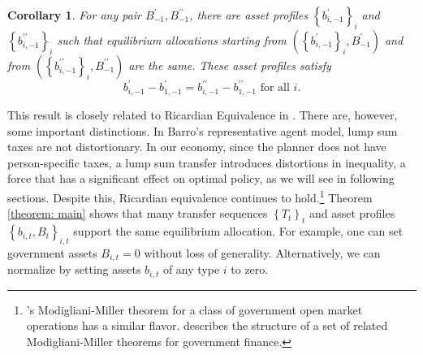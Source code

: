\documentclass[thmsb,11pt]{article}
\newtheorem{corollary}{Corollary}
\begin{document}
\begin{corollary}
\label{corr: B does not matter} For any pair $B_{-1}^{\prime },B_{-1}^{\prime
\prime }$, there are asset profiles $\left\{ b_{i,-1}^{\prime }\right\} _{i}$ and $%
\left\{ b_{i,-1}^{\prime \prime }\right\} _{i}$ such that
equilibrium allocations starting from  $\left( \left\{ b_{i,-1}^{\prime }\right\}
_{i},B_{-1}^{\prime }\right) $ and  from  $\left( \left\{ b_{i,-1}^{\prime
\prime }\right\} _{i},B_{-1}^{\prime \prime }\right) $ are the same.
These asset profiles satisfy%
\begin{equation*}
b_{i,-1}^{\prime }-b_{1,-1}^{\prime }=b_{i,-1}^{\prime \prime
}-b_{1,-1}^{\prime \prime }\text{ for all }i.
\end{equation*}
\end{corollary}
%


%

\smallskip
This result is closely related to Ricardian Equivalence in \citet{Barro1974}. There are, however, some important distinctions. In Barro's representative agent model, lump sum taxes are not distortionary. In our economy, since the planner does not have person-specific taxes, a lump sum transfer introduces distortions in inequality, a  force that has a significant effect on optimal policy,  as we will see in following sections.   Despite this, Ricardian equivalence continues to hold.\footnote{%
\citet{Wallace1981}'s Modigliani-Miller theorem for a class of government open
market operations has a similar flavor. \citet{sargent1987dynamic} describes the
structure of a set of related Modigliani-Miller theorems for government
finance.} %
Theorem \ref{theorem: main} shows that many  transfer
sequences $\left\{ T_{t}\right\} _{t}$ and asset profiles $\left\{
b_{i,t},B_{t}\right\} _{i,t}$  support the same  equilibrium allocation.
For example, one can set government assets $B_{i,t}=0$ without loss of
generality.
Alternatively,  we can normalize by setting assets $b_{i,t}$ of any type $i$ to zero.
\end{document}
